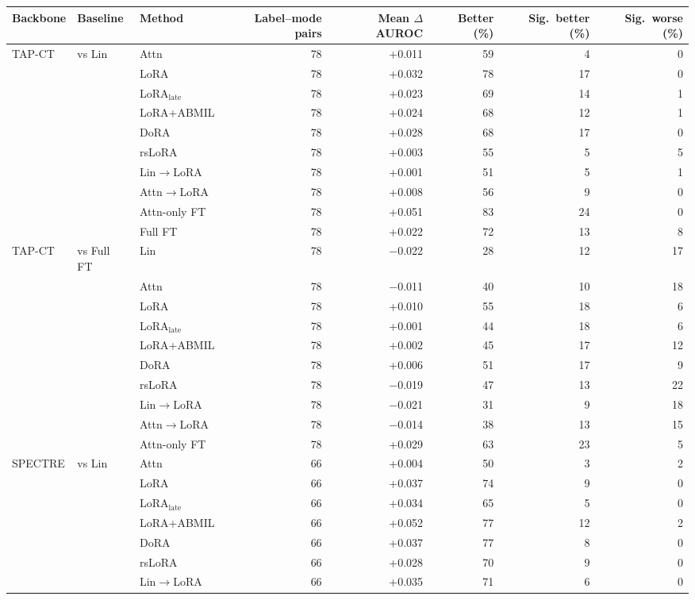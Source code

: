 \begin{tabular}{lllrrrrr}
\toprule
Backbone & Baseline & Method & Label--mode pairs & Mean $\Delta$AUROC & Better (\%) & Sig.\ better (\%) & Sig.\ worse (\%) \\
\midrule
TAP-CT & vs Lin & Attn & 78 & +0.011 & 59 & 4 & 0 \\
 &  & LoRA & 78 & +0.032 & 78 & 17 & 0 \\
 &  & LoRA$_{\text{late}}$ & 78 & +0.023 & 69 & 14 & 1 \\
 &  & LoRA+ABMIL & 78 & +0.024 & 68 & 12 & 1 \\
 &  & DoRA & 78 & +0.028 & 68 & 17 & 0 \\
 &  & rsLoRA & 78 & +0.003 & 55 & 5 & 5 \\
 &  & Lin$\to$LoRA & 78 & +0.001 & 51 & 5 & 1 \\
 &  & Attn$\to$LoRA & 78 & +0.008 & 56 & 9 & 0 \\
 &  & Attn-only FT & 78 & +0.051 & 83 & 24 & 0 \\
 &  & Full FT & 78 & +0.022 & 72 & 13 & 8 \\
\addlinespace[2pt]
TAP-CT & vs Full FT & Lin & 78 & $-$0.022 & 28 & 12 & 17 \\
 &  & Attn & 78 & $-$0.011 & 40 & 10 & 18 \\
 &  & LoRA & 78 & +0.010 & 55 & 18 & 6 \\
 &  & LoRA$_{\text{late}}$ & 78 & +0.001 & 44 & 18 & 6 \\
 &  & LoRA+ABMIL & 78 & +0.002 & 45 & 17 & 12 \\
 &  & DoRA & 78 & +0.006 & 51 & 17 & 9 \\
 &  & rsLoRA & 78 & $-$0.019 & 47 & 13 & 22 \\
 &  & Lin$\to$LoRA & 78 & $-$0.021 & 31 & 9 & 18 \\
 &  & Attn$\to$LoRA & 78 & $-$0.014 & 38 & 13 & 15 \\
 &  & Attn-only FT & 78 & +0.029 & 63 & 23 & 5 \\
\addlinespace[2pt]
SPECTRE & vs Lin & Attn & 66 & +0.004 & 50 & 3 & 2 \\
 &  & LoRA & 66 & +0.037 & 74 & 9 & 0 \\
 &  & LoRA$_{\text{late}}$ & 66 & +0.034 & 65 & 5 & 0 \\
 &  & LoRA+ABMIL & 66 & +0.052 & 77 & 12 & 2 \\
 &  & DoRA & 66 & +0.037 & 77 & 8 & 0 \\
 &  & rsLoRA & 66 & +0.028 & 70 & 9 & 0 \\
 &  & Lin$\to$LoRA & 66 & +0.035 & 71 & 6 & 0 \\

\end{tabular}

